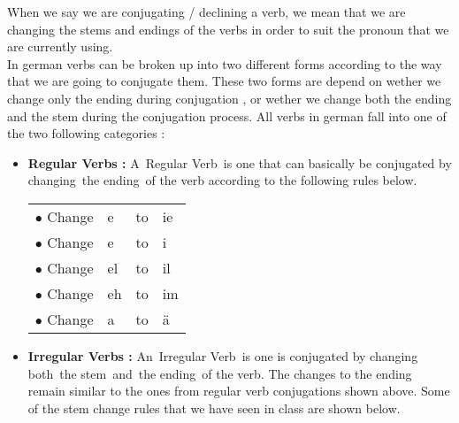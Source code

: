 \documentclass[a4paper,12pt]{article}
\begin{document}

When we say we are conjugating / declining a verb, we mean that we are changing
the stems and endings of the verbs in order to suit the pronoun that we are
currently using.\\

In german verbs can be broken up into two different forms according to the way
that we are going to conjugate them. These two forms are depend on wether we
change only the ending during conjugation , or wether we change both the ending
and the stem during the conjugation process. All verbs in german fall into one
of the two following categories :

\begin{itemize}[noitemsep] 

	\item \textbf {Regular Verbs :} A Regular Verb is one that can basically be
		conjugated by changing the ending of the verb according to the following
		rules below.\\


\vspace{0.3cm}
\begin{tabular}{l l l l}

\rowcolor{white} $\bullet$ Change & e  & to & ie\\
\rowcolor{white} $\bullet$ Change & e  & to & i\\
\rowcolor{white} $\bullet$ Change & el & to & il\\
\rowcolor{white} $\bullet$ Change & eh & to & im\\
\rowcolor{white} $\bullet$ Change & a  & to & ä\\

\end{tabular}
\vspace{0.3cm}
\newline


	\item \textbf {Irregular Verbs :} An Irregular Verb is one is conjugated by
		changing both the stem and the ending of the verb. The changes to the
		ending remain similar to the ones from regular verb conjugations shown
		above. Some of the stem change rules that we have seen in class are
		shown below.\\



\end{itemize}
\end{document}
